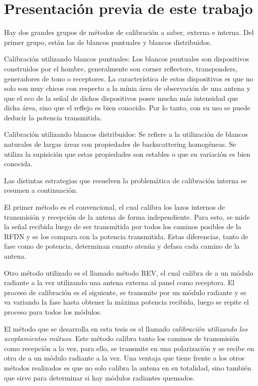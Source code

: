
\section{Presentación previa de este trabajo}

Hay dos grandes grupos de métodos de calibración a saber, externa e interna. Del primer grupo, están las de blancos 
puntuales y blancos distribuidos.

Calibración utilizando blancos puntuales: Los blancos puntuales son dispositivos construidos por el hombre, generalmente son
corner reflectors, transponders, generadores de tono o receptores. La característica de estos dispositivos es que no solo 
son muy chicos con respecto a la mínia área de observación de una antena y que el eco de la señal de dichos dispositivos 
posee mucha más intensidad que dicha área, sino que el reflejo es bien conocido. Por lo tanto, con su uso se puede deducir la potencia transmitida.

Calibración utilizando blancos distribuidos: Se refiere a la utilización de blancos naturales de largas áreas con 
propiedades de backscattering homogéneas. Se utiliza la supisición que estas propiedades son estables o que su variación es 
bien conocida.

Las distintas estrategias que resuelven la problemática de calibración interna se resumen a continuación. 

El primer método es el convencional, el cual calibra los lazos internos de transmisión y recepción de la antena de forma 
independiente. Para esto, se mide la señal recibida luego de ser transmitida por todos los caminos posibles de la RFDN
y se los compara con la potencia transmitida. Estas diferencias, tanto de fase como de potencia, determinan cuanto atenúa
y defasa cada camino de la antena. 

Otro método utilizado es el llamado método REV, el cual calibra de a un módulo radiante a la vez utilizando una antena externa
al panel como receptora. El proceso de calibración es el siguiente, se transmite por un módulo radiante y se va variando la 
fase hasta obtener la máxima potencia recibida, luego se repite el proceso para todos los módulos. 

El método que se desarrolla en esta tesis es el llamado \emph{calibración utilizando los acoplamientos mútuos}. Este método calibra 
tanto los caminos de transmisión como recepción a la vez, para ello, se transmite en una polarización y se recibe en otra de 
a un módulo radiante a la vez. Una ventaja que tiene frente a los otros métodos realizados es que no solo calibra la antena 
en su totalidad, sino también que sirve para determinar si hay módulos radiantes quemados.

